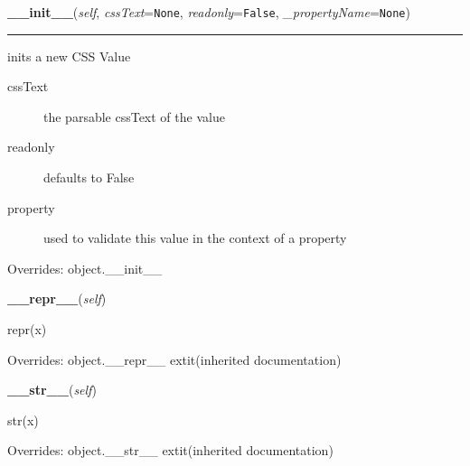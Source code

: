 \hspace{.8\funcindent}\begin{boxedminipage}{\funcwidth}

    \raggedright \textbf{\_\_init\_\_}(\textit{self}, \textit{cssText}={\tt None}, \textit{readonly}={\tt False}, \textit{\_propertyName}={\tt None})

    \vspace{-1.5ex}

    \rule{\textwidth}{0.5\fboxrule}
\setlength{\parskip}{2ex}

inits a new CSS Value
\begin{description}
\item[{cssText}] \leavevmode 
the parsable cssText of the value

\item[{readonly}] \leavevmode 
defaults to False

\item[{property}] \leavevmode 
used to validate this value in the context of a property

\end{description}
\setlength{\parskip}{1ex}
      Overrides: object.\_\_init\_\_

    \end{boxedminipage}

    \vspace{0.5ex}

\hspace{.8\funcindent}\begin{boxedminipage}{\funcwidth}

    \raggedright \textbf{\_\_repr\_\_}(\textit{self})

\setlength{\parskip}{2ex}
    repr(x)

\setlength{\parskip}{1ex}
      Overrides: object.\_\_repr\_\_ 	extit{(inherited documentation)}

    \end{boxedminipage}

    \vspace{0.5ex}

\hspace{.8\funcindent}\begin{boxedminipage}{\funcwidth}

    \raggedright \textbf{\_\_str\_\_}(\textit{self})

\setlength{\parskip}{2ex}
    str(x)

\setlength{\parskip}{1ex}
      Overrides: object.\_\_str\_\_ 	extit{(inherited documentation)}

    \end{boxedminipage}


